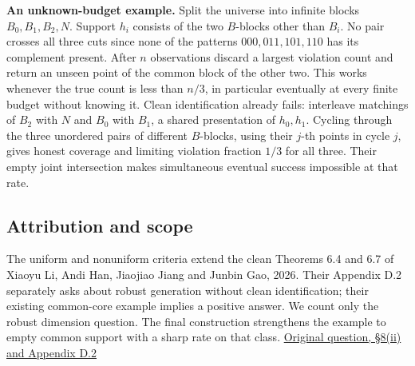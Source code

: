 \documentclass[11pt]{article}
\begin{document}
\textbf{An unknown-budget example.} Split the universe into infinite blocks \(B_0,B_1,B_2,N\). Support \(h_i\) consists of the two \(B\)-blocks other than \(B_i\). No pair crosses all three cuts since none of the patterns \(000,011,101,110\) has its complement present. After \(n\) observations discard a largest violation count and return an unseen point of the common block of the other two. This works whenever the true count is less than \(n/3\), in particular eventually at every finite budget without knowing it. Clean identification already fails: interleave matchings of \(B_2\) with \(N\) and \(B_0\) with \(B_1\), a shared presentation of \(h_0,h_1\). Cycling through the three unordered pairs of different \(B\)-blocks, using their \(j\)-th points in cycle \(j\), gives honest coverage and limiting violation fraction \(1/3\) for all three. Their empty joint intersection makes simultaneous eventual success impossible at that rate.

\subsection{Attribution and scope}\label{attribution-and-scope}

The uniform and nonuniform criteria extend the clean Theorems 6.4 and 6.7 of Xiaoyu Li, Andi Han, Jiaojiao Jiang and Junbin Gao, 2026. Their Appendix D.2 separately asks about robust generation without clean identification; their existing common-core example implies a positive answer. We count only the robust dimension question. The final construction strengthens the example to empty common support with a sharp rate on that class. \href{https://arxiv.org/abs/2605.06211v2}{Original question, §8(ii) and Appendix D.2}
\end{document}

